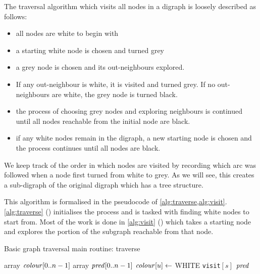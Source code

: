 The traversal algorithm which visits all nodes in a digraph is loosely described as follows: 
\begin{itemize}
\item all nodes are white to begin with
\item a starting white node is chosen and turned grey
\item a grey node is chosen and its out-neighbours explored. 
\item If any out-neighbour is white, it is visited and turned grey. If no out-neighbours are white, the grey node is turned black. 
\item the process of choosing grey nodes and exploring neighbours is continued until all nodes reachable from the initial node are black.
\item if any white nodes remain in the digraph, a new  starting node is chosen and the process continues until all nodes are black.
\end{itemize}

We keep track of the order in which nodes are visited by recording which arc was followed when a node first turned from white to grey. As we will see, this creates a sub-digraph of the original digraph which has a tree structure.

This algorithm is formalised in the pseudocode  of \cref{alg:traverse,alg:visit}. \cref{alg:traverse} () initialises the process and is tasked with finding white nodes to start from. Most of the work is done in \cref{alg:visit} () which takes a starting node and explores the portion of the subgraph reachable from that node.

\begin{algorithm}[H]
  \caption{Basic graph traversal main routine: traverse
    \label{alg:traverse}}
\begin{algorithmic}[1]
	\State  array $\operatorname{\text{\textit{colour}}}[0..n-1]$ 
	\State array $\operatorname{\text{\textit{pred}}}[0..n-1]$ 
	 
	\State $\operatorname{\text{\textit{colour}}}[u] \gets $ WHITE 
	\EndFor
	  
	\State \texttt{visit}$[s]$ 
	\EndIf
	\EndFor
	\Return $\operatorname{\text{\textit{pred}}}$ 
\EndFunction
\end{algorithmic}
\end{algorithm}


